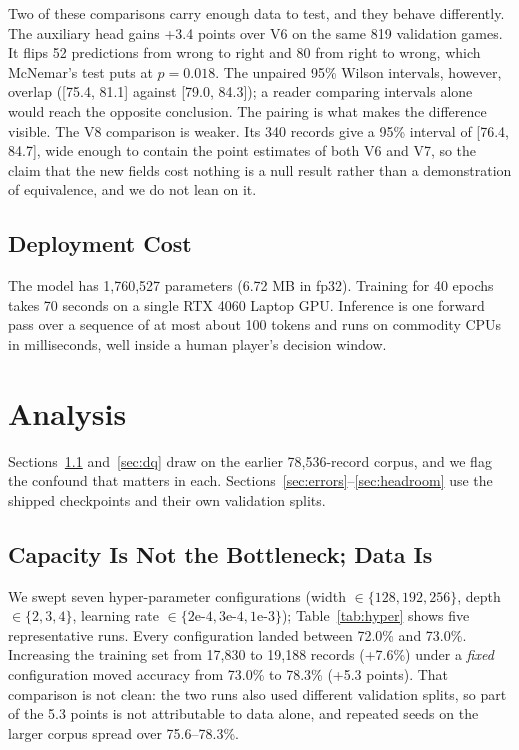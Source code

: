 \documentclass[11pt]{article}
\begin{document}
Two of these comparisons carry enough data to test, and they behave differently. The auxiliary head gains +3.4 points over V6 on the same 819 validation games. It flips
52 predictions from wrong to right and 80 from right to wrong, which McNemar's test puts at
$p=0.018$. The unpaired 95\% Wilson intervals, however, overlap ([75.4, 81.1] against
[79.0, 84.3]); a reader comparing intervals alone would reach the opposite conclusion. The
pairing is what makes the difference visible. The V8 comparison is
weaker. Its 340 records give a 95\% interval of [76.4, 84.7], wide enough to contain the
point estimates of both V6 and V7, so the claim that the new fields cost nothing is a null
result rather than a demonstration of equivalence, and we do not lean on it.

\subsection{Deployment Cost}

The model has 1,760,527 parameters (6.72 MB in fp32). Training for 40 epochs takes 70
seconds on a single RTX 4060 Laptop GPU. Inference is one forward pass over a sequence of
at most about 100 tokens and runs on commodity CPUs in milliseconds, well inside a human
player's decision window.

\section{Analysis}
\label{sec:analysis}

Sections~\ref{sec:capacity} and~\ref{sec:dq} draw on the earlier 78,536-record corpus, and
we flag the confound that matters in each. Sections~\ref{sec:errors}--\ref{sec:headroom}
use the shipped checkpoints and their own validation splits.

\subsection{Capacity Is Not the Bottleneck; Data Is}
\label{sec:capacity}

We swept seven hyper-parameter configurations (width $\in \{128,192,256\}$, depth $\in
\{2,3,4\}$, learning rate $\in \{2\text{e-}4, 3\text{e-}4, 1\text{e-}3\}$); Table~\ref{tab:hyper}
shows five representative runs. Every configuration landed between 72.0\% and 73.0\%.
Increasing the training set from 17,830 to 19,188 records (+7.6\%) under a \emph{fixed}
configuration moved accuracy from 73.0\% to 78.3\% (+5.3 points). That comparison is not
clean: the two runs also used different validation splits, so part of the 5.3 points is not
attributable to data alone, and repeated seeds on the larger corpus spread over
75.6--78.3\%.
\end{document}
